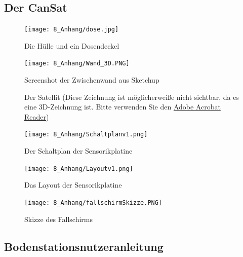 \newpage
\subsection{Der CanSat}

\begin{figure}[H]
	\centering
	\texttt{[image: 8\_Anhang/dose.jpg]}
	\caption{Die Hülle und ein Dosendeckel}
	\label{pic_dose}
\end{figure}

\begin{figure}[H]
	\centering
	\texttt{[image: 8\_Anhang/Wand\_3D.PNG]}
	\caption{Screenshot der Zwischenwand aus Sketchup}
	\label{pic_wand_3d}
\end{figure}

\newpage

\begin{figure}[h] 
      \centering 
      \caption{Der Satellit (Diese Zeichnung ist möglicherweiße nicht sichtbar, da es eine 3D-Zeichnung ist. Bitte verwenden Sie den \href{https://get.adobe.com/reader/?loc=de}{Adobe Acrobat Reader})}\label{pic_3d} 
\end{figure} 

\newpage

\begin{figure}[H]
	\centering
	\texttt{[image: 8\_Anhang/Schaltplanv1.png]}
	\caption{Der Schaltplan der Sensorikplatine}
	\label{pic_schaltplan}
\end{figure}

\newpage

\begin{figure}[H]
	\centering
	\texttt{[image: 8\_Anhang/Layoutv1.png]}
	\caption{Das Layout der Sensorikplatine}
	\label{pic_layout}
\end{figure}

\newpage

\begin{figure}[H]
	\centering
	\texttt{[image: 8\_Anhang/fallschirmSkizze.PNG]}
	\caption{Skizze des Fallschirms}
	\label{pic_fallschrimskizze}
\end{figure}

\newpage

\subsection{Bodenstationsnutzeranleitung}
\label{bodenstationsanleitung}

